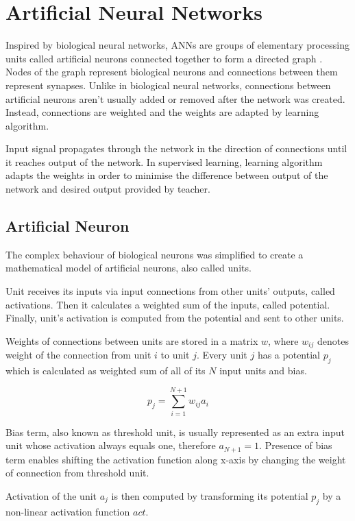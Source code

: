 \documentclass[12pt,oneside]{fithesis2}
\begin{document}
\chapter{Artificial Neural Networks}
Inspired by biological neural networks, ANNs are groups of elementary processing units called artificial neurons connected together to form a directed graph \cite{haykin2009neural}. Nodes of the graph represent biological neurons and connections between them represent synapses. Unlike in biological neural networks, connections between artificial neurons aren't usually added or removed after the network was created. Instead, connections are weighted and the weights are adapted by learning algorithm. \par

Input signal propagates through the network in the direction of connections until it reaches output of the network. In supervised learning, learning algorithm adapts the weights in order to minimise the difference between output of the network and desired output provided by teacher.

\section{Artificial Neuron}
The complex behaviour of biological neurons was simplified to create a mathematical model of artificial neurons, also called units. \par
Unit receives its inputs via input connections from other units' outputs, called activations. Then it calculates a weighted sum of the inputs, called potential. Finally, unit's activation is computed from the potential and sent to other units. \par

Weights of connections between units are stored in a matrix $w$, where $w_{ij}$ denotes weight of the connection from unit $i$ to unit $j$. Every unit $j$ has a potential $p_j$ which is calculated as weighted sum of all of its $N$ input units and bias. \par

$$p_{j} = \sum\limits_{i = 1}^{N+1} w_{ij} a_{i}$$

Bias term, also known as threshold unit, is usually represented as an extra input unit whose activation always equals one, therefore $a_{N+1} = 1$. Presence of bias term enables shifting the activation function along x-axis by changing the weight of connection from threshold unit.

Activation of the unit $a_j$ is then computed by transforming its potential $p_j$ by a non-linear activation function $act$.
\end{document}
